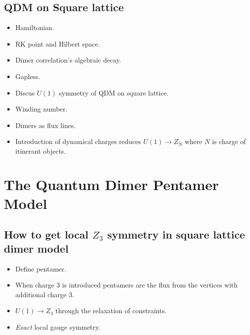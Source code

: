 \documentclass[aps,floatfix,11pt]{revtex4-1}
\begin{document}
    \subsection{QDM on Square lattice}
        \begin{itemize}
            \item Hamiltonian.
            \item RK point and Hilbert space.
            \item Dimer correlation's algebraic decay.
            \item Gapless.
            \item Discus $U(1)$ symmetry of QDM on square lattice.
            \item Winding number.
            \item Dimers as flux lines.
            \item Introduction of dynamical charges reduces $U(1) \rightarrow Z_N$ where $N$ is
                charge of itinerant objects.
        \end{itemize}


\clearpage
\section{The Quantum Dimer Pentamer Model}

    \subsection{How to get local $Z_3$ symmetry in square lattice dimer model}
        \begin{itemize}
            \item Define pentamer.
            \item When charge 3 is introduced pentamers are the flux from the vertices with
                additional charge 3.
            \item $U(1) \rightarrow Z_3$ through the relaxation of constraints.
            \item \textit{Exact} local gauge symmetry.
        \end{itemize}
\end{document}
